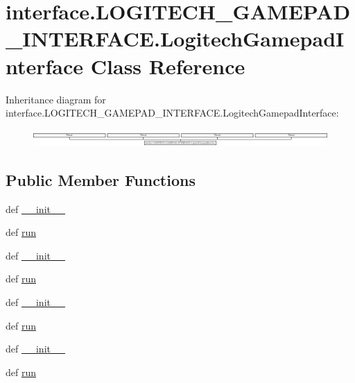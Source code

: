 \hypertarget{classinterface_1_1LOGITECH__GAMEPAD__INTERFACE_1_1LogitechGamepadInterface}{}\section{interface.\+L\+O\+G\+I\+T\+E\+C\+H\+\_\+\+G\+A\+M\+E\+P\+A\+D\+\_\+\+I\+N\+T\+E\+R\+F\+A\+C\+E.\+Logitech\+Gamepad\+Interface Class Reference}
\label{classinterface_1_1LOGITECH__GAMEPAD__INTERFACE_1_1LogitechGamepadInterface}
Inheritance diagram for interface.\+L\+O\+G\+I\+T\+E\+C\+H\+\_\+\+G\+A\+M\+E\+P\+A\+D\+\_\+\+I\+N\+T\+E\+R\+F\+A\+C\+E.\+Logitech\+Gamepad\+Interface\+:\begin{figure}[H]
\begin{center}
\leavevmode
\includegraphics[height=0.640732cm]{classinterface_1_1LOGITECH__GAMEPAD__INTERFACE_1_1LogitechGamepadInterface}
\end{center}
\end{figure}
\subsection*{Public Member Functions}
\begin{DoxyCompactItemize}
\item 
def \hyperlink{classinterface_1_1LOGITECH__GAMEPAD__INTERFACE_1_1LogitechGamepadInterface_ae9cbbecadf735d90cf9834b4df772d2d}{\+\_\+\+\_\+init\+\_\+\+\_\+}
\item 
def \hyperlink{classinterface_1_1LOGITECH__GAMEPAD__INTERFACE_1_1LogitechGamepadInterface_a759473f1f4a54af72dabd5dcfa3f5d3b}{run}
\item 
def \hyperlink{classinterface_1_1LOGITECH__GAMEPAD__INTERFACE_1_1LogitechGamepadInterface_ae9cbbecadf735d90cf9834b4df772d2d}{\+\_\+\+\_\+init\+\_\+\+\_\+}
\item 
def \hyperlink{classinterface_1_1LOGITECH__GAMEPAD__INTERFACE_1_1LogitechGamepadInterface_a759473f1f4a54af72dabd5dcfa3f5d3b}{run}
\item 
def \hyperlink{classinterface_1_1LOGITECH__GAMEPAD__INTERFACE_1_1LogitechGamepadInterface_ae9cbbecadf735d90cf9834b4df772d2d}{\+\_\+\+\_\+init\+\_\+\+\_\+}
\item 
def \hyperlink{classinterface_1_1LOGITECH__GAMEPAD__INTERFACE_1_1LogitechGamepadInterface_a759473f1f4a54af72dabd5dcfa3f5d3b}{run}
\item 
def \hyperlink{classinterface_1_1LOGITECH__GAMEPAD__INTERFACE_1_1LogitechGamepadInterface_ae9cbbecadf735d90cf9834b4df772d2d}{\+\_\+\+\_\+init\+\_\+\+\_\+}
\item 
def \hyperlink{classinterface_1_1LOGITECH__GAMEPAD__INTERFACE_1_1LogitechGamepadInterface_a759473f1f4a54af72dabd5dcfa3f5d3b}{run}
\end{DoxyCompactItemize}

